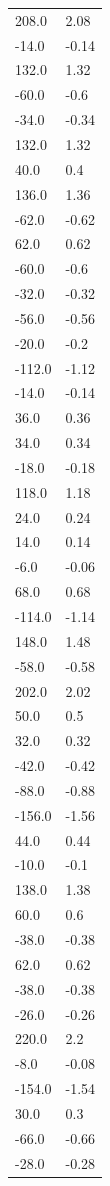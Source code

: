 \begin{longtable}{ll}
208.0 & 2.08 \\
-14.0 & -0.14 \\
132.0 & 1.32 \\
-60.0 & -0.6 \\
-34.0 & -0.34 \\
132.0 & 1.32 \\
40.0 & 0.4 \\
136.0 & 1.36 \\
-62.0 & -0.62 \\
62.0 & 0.62 \\
-60.0 & -0.6 \\
-32.0 & -0.32 \\
-56.0 & -0.56 \\
-20.0 & -0.2 \\
-112.0 & -1.12 \\
-14.0 & -0.14 \\
36.0 & 0.36 \\
34.0 & 0.34 \\
-18.0 & -0.18 \\
118.0 & 1.18 \\
24.0 & 0.24 \\
14.0 & 0.14 \\
-6.0 & -0.06 \\
68.0 & 0.68 \\
-114.0 & -1.14 \\
148.0 & 1.48 \\
-58.0 & -0.58 \\
202.0 & 2.02 \\
50.0 & 0.5 \\
32.0 & 0.32 \\
-42.0 & -0.42 \\
-88.0 & -0.88 \\
-156.0 & -1.56 \\
44.0 & 0.44 \\
-10.0 & -0.1 \\
138.0 & 1.38 \\
60.0 & 0.6 \\
-38.0 & -0.38 \\
62.0 & 0.62 \\
-38.0 & -0.38 \\
-26.0 & -0.26 \\
220.0 & 2.2 \\
-8.0 & -0.08 \\
-154.0 & -1.54 \\
30.0 & 0.3 \\
-66.0 & -0.66 \\
-28.0 & -0.28 \\

\end{longtable}
